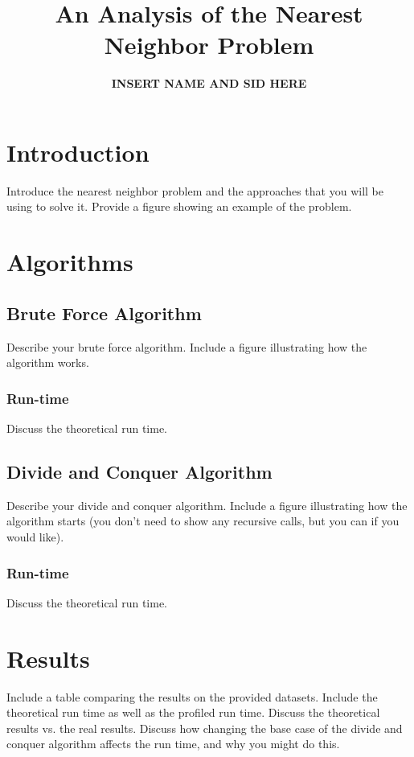 \documentclass{article}
\title{An Analysis of the Nearest Neighbor Problem}
\author{\textbf{INSERT NAME AND SID HERE}}
\begin{document}
\twocolumn
\maketitle
\section{Introduction}
Introduce the nearest neighbor problem and the approaches that you will be using to solve it. Provide a figure showing an example of the problem. 

\section{Algorithms}
\subsection{Brute Force Algorithm}
Describe your brute force algorithm. Include a figure illustrating how the algorithm works. 
\subsubsection*{Run-time}
Discuss the theoretical run time.

\subsection{Divide and Conquer Algorithm}
Describe your divide and conquer algorithm. Include a figure illustrating how the algorithm starts (you don't need to show any recursive calls, but you can if you would like).
\subsubsection*{Run-time}
Discuss the theoretical run time.

\section{Results}
Include a table comparing the results on the provided datasets. Include the theoretical run time as well as the profiled run time. Discuss the theoretical results vs. the real results. Discuss how changing the base case of the divide and conquer algorithm affects the run time, and why you might do this. 
\end{document}

